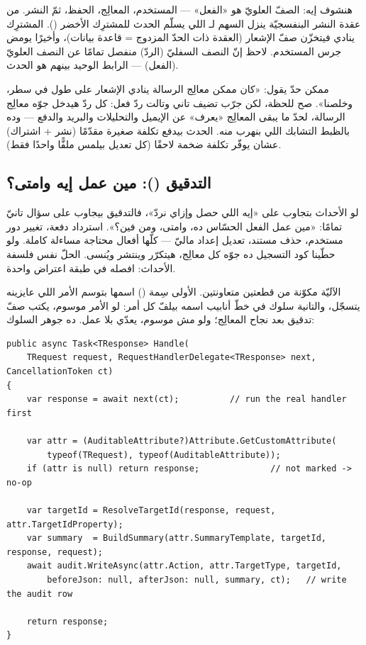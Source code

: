 هنشوف إيه: الصفّ العلويّ هو «الفعل» — المستخدم، المعالِج، الحفظ، ثمّ النشر. من عقدة
النشر البنفسجيّة ينزل السهم لـ اللي يسلّم الحدث للمشترِك الأخضر
(). المشترِك ينادي  فيتخزّن صفّ الإشعار
(العقدة ذات الحدّ المزدوج = قاعدة بيانات)، وأخيرًا يومض جرس المستخدم. لاحظ إنّ
النصف السفليّ (الردّ) منفصل تمامًا عن النصف العلويّ (الفعل) — الرابط الوحيد بينهم
هو الحدث.

\begin{qa}
ممكن حدّ يقول: «كان ممكن معالِج الرسالة ينادي الإشعار على طول في سطر، وخلصنا».
صح للحظة، لكن جرّب تضيف تاني وتالت ردّ فعل: كل ردّ هيدخل جوّه معالِج الرسالة، لحدّ
ما يبقى المعالِج «يعرف» عن الإيميل والتحليلات والبريد والدفع — وده بالظبط التشابك
اللي بنهرب منه. الحدث بيدفع تكلفة صغيرة مقدّمًا (نشر + اشتراك) عشان يوفّر تكلفة
ضخمة لاحقًا (كل تعديل بيلمس ملفًّا واحدًا فقط).
\end{qa}

\subsection{التدقيق (): مين عمل إيه وامتى؟}

لو الأحداث بتجاوب على «إيه اللي حصل وإزاي نردّ»، فالتدقيق بيجاوب على سؤال تانيّ
تمامًا: «مين عمل الفعل الحسّاس ده، وامتى، ومن فين؟». استرداد دفعة، تغيير دور
مستخدم، حذف مستند، تعديل إعداد ماليّ — كلّها أفعال محتاجة مساءلة كاملة. ولو
حطّينا كود التسجيل ده جوّه كل معالِج، هيتكرّر وينتشر ويُنسى. الحلّ نفس فلسفة
الأحداث: افصله في طبقة اعتراض واحدة.

الآليّة مكوّنة من قطعتين متعاونتين. الأولى سِمة () اسمها
\code{[Auditable]} بتوسم الأمر اللي عايزينه يتسجّل، والتانية سلوك في خطّ أنابيب
 اسمه  بيلفّ كل أمر: لو الأمر موسوم، يكتب صفّ تدقيق
بعد نجاح المعالِج؛ ولو مش موسوم، يعدّي بلا عمل. ده جوهر السلوك:

\begin{english}
\begin{lstlisting}[language={[Sharp]C}]
public async Task<TResponse> Handle(
    TRequest request, RequestHandlerDelegate<TResponse> next, CancellationToken ct)
{
    var response = await next(ct);          // run the real handler first

    var attr = (AuditableAttribute?)Attribute.GetCustomAttribute(
        typeof(TRequest), typeof(AuditableAttribute));
    if (attr is null) return response;              // not marked -> no-op

    var targetId = ResolveTargetId(response, request, attr.TargetIdProperty);
    var summary  = BuildSummary(attr.SummaryTemplate, targetId, response, request);
    await audit.WriteAsync(attr.Action, attr.TargetType, targetId,
        beforeJson: null, afterJson: null, summary, ct);   // write the audit row

    return response;
}
\end{lstlisting}
\end{english}

